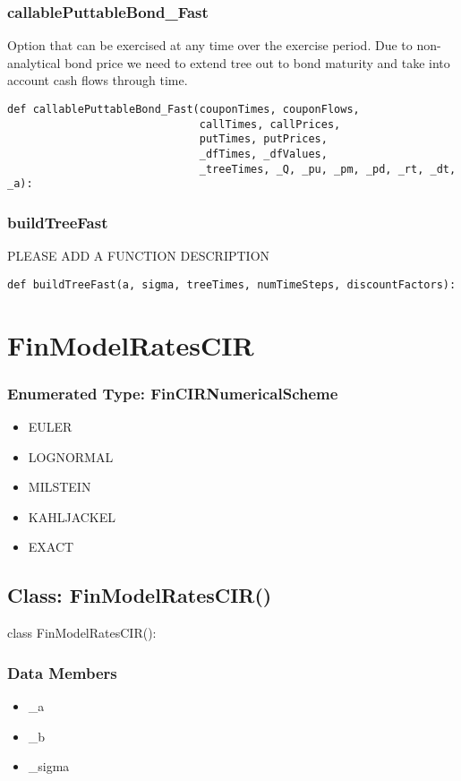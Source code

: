 \documentclass[twoside,11pt]{book}
\begin{document}
\subsubsection*{{\bf callablePuttableBond\_Fast}}
Option that can be exercised at any time over the exercise period. Due to non-analytical bond price we need to extend tree out to bond maturity and take into account cash flows through time.  

\begin{lstlisting}
def callablePuttableBond_Fast(couponTimes, couponFlows,
                              callTimes, callPrices,
                              putTimes, putPrices,
                              _dfTimes, _dfValues,
                              _treeTimes, _Q, _pu, _pm, _pd, _rt, _dt, _a):
\end{lstlisting}

\subsubsection*{{\bf buildTreeFast}}
PLEASE ADD A FUNCTION DESCRIPTION

\begin{lstlisting}
def buildTreeFast(a, sigma, treeTimes, numTimeSteps, discountFactors):
\end{lstlisting}

\newpage
\section{FinModelRatesCIR}

\subsubsection{Enumerated Type: FinCIRNumericalScheme}
\begin{itemize}
\item{EULER}
\item{LOGNORMAL}
\item{MILSTEIN}
\item{KAHLJACKEL}
\item{EXACT}
\end{itemize}

\subsection*{Class: FinModelRatesCIR()}
class FinModelRatesCIR(): 

\subsubsection*{Data Members}
\begin{itemize}
\item{\_a}
\item{\_b}
\item{\_sigma}
\end{itemize}
\end{document}
